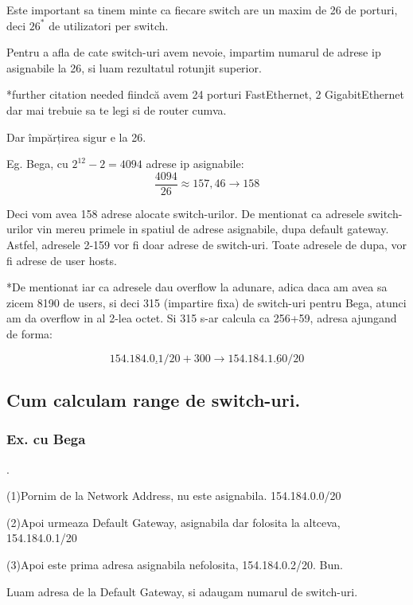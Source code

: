 \documentclass{article}
\begin{document}
Este important sa tinem minte ca fiecare switch are un maxim de 26 de porturi, deci $26^{*}$ de utilizatori per switch. 

Pentru a afla de cate switch-uri avem nevoie, impartim numarul de adrese ip asignabile la 26, si luam rezultatul rotunjit superior.

*further citation needed fiindcă avem 24 porturi FastEthernet, 2 GigabitEthernet dar mai trebuie sa te legi si de router cumva.

Dar împărțirea sigur e la 26.

Eg. Bega, cu $2^{12}-2=4094$ adrese ip asignabile:
   \[\frac{4094}{26}\approx 157,46 \rightarrow 158\]


Deci vom avea 158 adrese alocate switch-urilor.
De mentionat ca adresele switch-urilor vin mereu primele in spatiul de adrese asignabile, dupa default gateway.
Astfel, adresele 2-159 vor fi doar adrese de switch-uri. Toate adresele de dupa, vor fi adrese de user hosts.

 *De mentionat iar ca adresele dau overflow la adunare, adica daca am avea sa zicem 8190 de users, si deci 315 (impartire fixa) de switch-uri pentru Bega, atunci am da overflow in al 2-lea octet. Si 315 s-ar calcula ca 256+59, adresa ajungand de forma:
 \begin{center}
 \[154.184.\underline{0.1}/20 + 300 \rightarrow  154.184.\underline{1.60}/20\]
\end{center}







\subsection{Cum calculam range de switch-uri.} 
\subsubsection{Ex. cu Bega}.

\begingroup

(1)Pornim de la Network Address, nu este asignabila. 154.184.0.0/20

(2)Apoi urmeaza Default Gateway, asignabila dar folosita la altceva, 154.184.0.1/20

(3)Apoi este prima adresa asignabila nefolosita, 154.184.0.2/20. Bun.



Luam adresa de la Default Gateway, si adaugam numarul de switch-uri.
\end{document}
